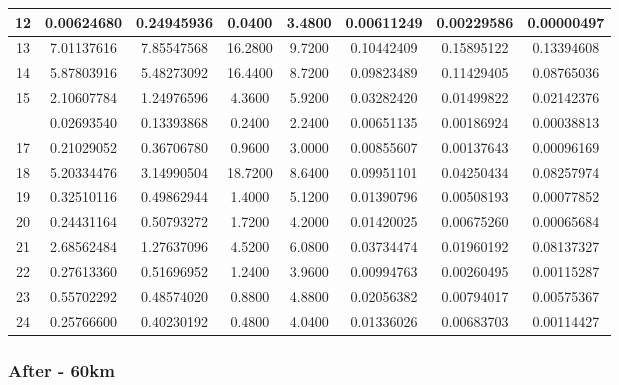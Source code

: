 \documentclass[12pt,a4paper]{thesis}
\begin{document}
\begin{table}[H]
\begin{tabular}{|c|c|c|c|c|c|c|c|}
\hline	12	&	0.00624680	&	0.24945936	&	0.0400	&	3.4800	&	0.00611249	&	0.00229586	&	0.00000497	\\
\hline	13	&	7.01137616	&	7.85547568	&	16.2800	&	9.7200	&	0.10442409	&	0.15895122	&	0.13394608	\\
\hline	14	&	5.87803916	&	5.48273092	&	16.4400	&	8.7200	&	0.09823489	&	0.11429405	&	0.08765036	\\
\hline	15	&	2.10607784	&	1.24976596	&	4.3600	&	5.9200	&	0.03282420	&	0.01499822	&	0.02142376	\\
\rowcolor{yellow}
\hline	16	&	0.02693540	&	0.13393868	&	0.2400	&	2.2400	&	0.00651135	&	0.00186924	&	0.00038813	\\
\hline	17	&	0.21029052	&	0.36706780	&	0.9600	&	3.0000	&	0.00855607	&	0.00137643	&	0.00096169	\\
\hline	18	&	5.20334476	&	3.14990504	&	18.7200	&	8.6400	&	0.09951101	&	0.04250434	&	0.08257974	\\
\hline	19	&	0.32510116	&	0.49862944	&	1.4000	&	5.1200	&	0.01390796	&	0.00508193	&	0.00077852	\\
\hline	20	&	0.24431164	&	0.50793272	&	1.7200	&	4.2000	&	0.01420025	&	0.00675260	&	0.00065684	\\
\hline	21	&	2.68562484	&	1.27637096	&	4.5200	&	6.0800	&	0.03734474	&	0.01960192	&	0.08137327	\\
\hline	22	&	0.27613360	&	0.51696952	&	1.2400	&	3.9600	&	0.00994763	&	0.00260495	&	0.00115287	\\
\hline	23	&	0.55702292	&	0.48574020	&	0.8800	&	4.8800	&	0.02056382	&	0.00794017	&	0.00575367	\\
\hline	24	&	0.25766600	&	0.40230192	&	0.4800	&	4.0400	&	0.01336026	&	0.00683703	&	0.00114427	\\
\hline 
\end{tabular} 
\label{tab:ariadneNodeBefore100}
\end{table}



\subsubsection{After - 60km}
\end{document}
